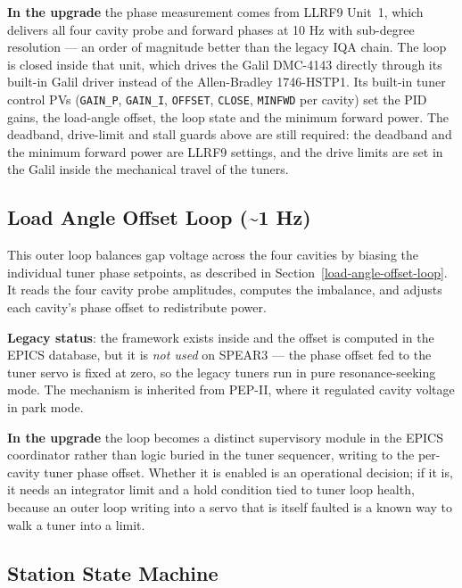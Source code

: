 \textbf{In the upgrade} the phase measurement comes from LLRF9 Unit~1, which delivers all four cavity probe and forward phases at 10 Hz with sub-degree resolution --- an order of magnitude better than the legacy IQA chain. The loop is closed inside that unit, which drives the Galil DMC-4143 directly through its built-in Galil driver instead of the Allen-Bradley 1746-HSTP1. Its built-in tuner control PVs (\texttt{GAIN\_P}, \texttt{GAIN\_I}, \texttt{OFFSET}, \texttt{CLOSE}, \texttt{MINFWD} per cavity) set the PID gains, the load-angle offset, the loop state and the minimum forward power. The deadband, drive-limit and stall guards above are still required: the deadband and the minimum forward power are LLRF9 settings, and the drive limits are set in the Galil inside the mechanical travel of the tuners.

\subsection{Load Angle Offset Loop (\textasciitilde1 Hz)}\label{load-angle-offset-loop-1-hz}

This outer loop balances gap voltage across the four cavities by biasing the individual tuner phase setpoints, as described in Section~\ref{load-angle-offset-loop}. It reads the four cavity probe amplitudes, computes the imbalance, and adjusts each cavity's phase offset to redistribute power.

\textbf{Legacy status}: the framework exists inside  and the offset is computed in the EPICS database, but it is \emph{not used} on SPEAR3 --- the phase offset fed to the tuner servo is fixed at zero, so the legacy tuners run in pure resonance-seeking mode. The mechanism is inherited from PEP-II, where it regulated cavity voltage in park mode.

\textbf{In the upgrade} the loop becomes a distinct supervisory module in the EPICS coordinator rather than logic buried in the tuner sequencer, writing to the per-cavity tuner phase offset. Whether it is enabled is an operational decision; if it is, it needs an integrator limit and a hold condition tied to tuner loop health, because an outer loop writing into a servo that is itself faulted is a known way to walk a tuner into a limit.

\subsection{Station State Machine}\label{station-state-machine}

